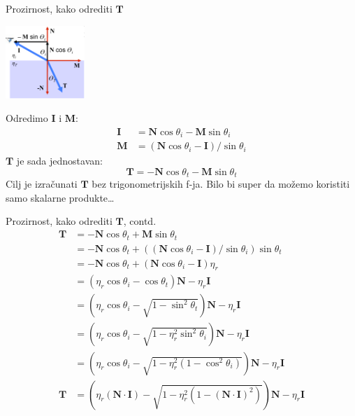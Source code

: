 \documentclass[9pt]{beamer}
\begin{document}
\begin{frame}{Prozirnost, kako odrediti $\mathbf{T}$}
\begin{center}
\includegraphics[width=3cm]{slike/prozirnost_03.png}
\end{center}
Odredimo $\mathbf{I}$ i $\mathbf{M}$:
\begin{align*}
\mathbf{I} &= \mathbf{N}\cos\theta_i - \mathbf{M}\sin\theta_i \\
\mathbf{M} &= (\mathbf{N}\cos\theta_i - \mathbf{I})/\sin\theta_i
\end{align*}
$\mathbf{T}$ je sada jednostavan:
$$ \mathbf{T} = -\mathbf{N}\cos\theta_t - \mathbf{M}\sin\theta_t $$
Cilj je izračunati $\mathbf{T}$ bez trigonometrijskih f-ja. Bilo bi super da možemo
koristiti samo skalarne produkte\ldots
\end{frame}

\begin{frame}{Prozirnost, kako odrediti $\mathbf{T}$, contd.}
\begin{align}
\mathbf{T} &= -\mathbf{N}\cos\theta_t + \mathbf{M}\sin\theta_t \\
&= -\mathbf{N}\cos\theta_t + ((\mathbf{N}\cos\theta_i - \mathbf{I})/\sin\theta_i)\sin\theta_t \\
&= -\mathbf{N}\cos\theta_t + (\mathbf{N}\cos\theta_i - \mathbf{I})\eta_r \\
&= \left(\eta_r\cos\theta_i - \cos\theta_t\right)\mathbf{N} - \eta_r\mathbf{I} \\
&= \left(\eta_r\cos\theta_i - \sqrt{1-\sin^2\theta_t}\right)\mathbf{N} - \eta_r\mathbf{I} \\
&= \left(\eta_r\cos\theta_i - \sqrt{1-\eta_r^2\sin^2\theta_i}\right)\mathbf{N} - \eta_r\mathbf{I} \\
&= \left(\eta_r\cos\theta_i - \sqrt{1-\eta_r^2(1-\cos^2\theta_i)}\right)\mathbf{N} - \eta_r\mathbf{I} \\
\mathbf{T} &= \left(\eta_r(\mathbf{N}\cdot \mathbf{I}) - \sqrt{1-\eta_r^2(1-(\mathbf{N}\cdot \mathbf{I})^2)}\right)\mathbf{N} - \eta_r\mathbf{I}
\end{align}
\end{frame}
\end{document}
